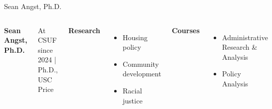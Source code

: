 \documentclass[10pt]{beamer}
\newlength{\imageheight}
\begin{document}
\begin{frame}{Sean Angst, Ph.D.}
\begin{columns}[T,onlytextwidth]
    \raggedright
    {\large\bfseries Sean Angst, Ph.D.}\par
    {\footnotesize At CSUF since 2024 \quad | \quad Ph.D., USC Price}\par\vspace{0.4em}

    \textbf{Research}
    \begin{itemize}
      \item Housing policy
      \item Community development
      \item Racial justice
    \end{itemize}

    \textbf{Courses}
    \begin{itemize}
      \item Administrative Research \& Analysis
      \item Policy Analysis
    \end{itemize}

    \vspace*{0.25cm}
    \includegraphics[height=\imageheight]{images/angst.jpg}
\end{columns}
\end{frame}
\end{document}
